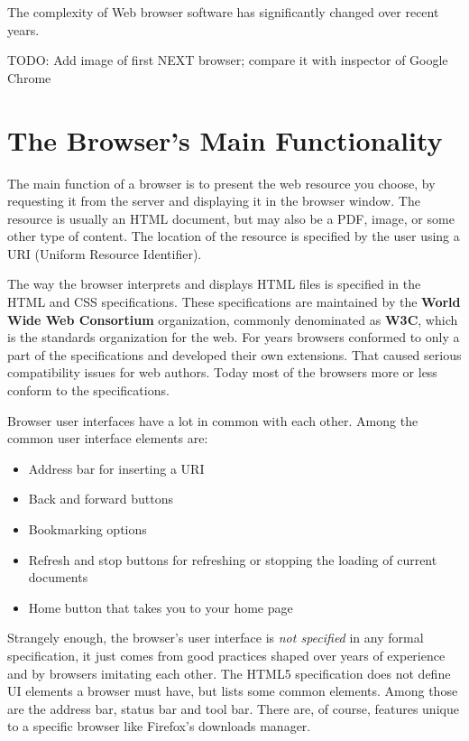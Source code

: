\documentclass[a4paper, justified, notoc]{tufte-handout} %
\begin{document}
The complexity of Web browser software has significantly changed over recent years.

TODO: Add image of first NEXT browser; compare it with inspector of Google Chrome






\section{The Browser's Main Functionality} %
\label{sec:the_browser_s_main_functionality}
The main function of a browser is to present the web resource you choose, by requesting it from the server and displaying it in the browser window. The resource is usually an HTML document, but may also be a PDF, image, or some other type of content. The location of the resource is specified by the user using a URI (Uniform Resource Identifier).

The way the browser interprets and displays HTML files is specified in the HTML and CSS specifications. These specifications are maintained by the \textbf{World Wide Web Consortium} organization, commonly denominated as \textbf{W3C}, which is the standards organization for the web. For years browsers conformed to only a part of the specifications and developed their own extensions. That caused serious compatibility issues for web authors. Today most of the browsers more or less conform to the specifications.

Browser user interfaces have a lot in common with each other. Among the common user interface elements are:
\begin{itemize}
	\item Address bar for inserting a URI
	\item Back and forward buttons
	\item Bookmarking options
	\item Refresh and stop buttons for refreshing or stopping the loading of current documents
	\item Home button that takes you to your home page
\end{itemize}

Strangely enough, the browser's user interface is \emph{not specified} in any formal specification, it just comes from good practices shaped over years of experience and by browsers imitating each other. The HTML5 specification does not define UI elements a browser must have, but lists some common elements. Among those are the address bar, status bar and tool bar. There are, of course, features unique to a specific browser like Firefox's downloads manager.
\end{document}
